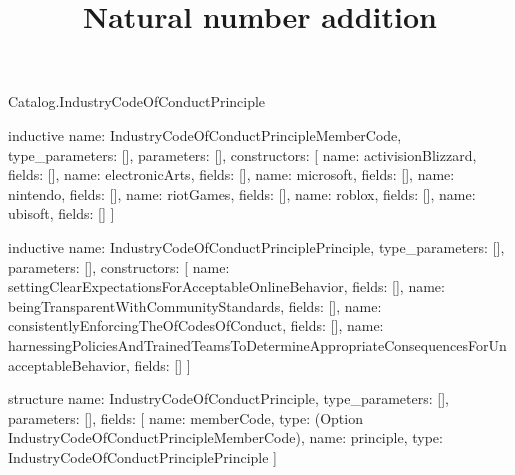 \begin{lexlean}{Catalog.IndustryCodeOfConductPrinciple}
\title{Natural number addition}
\begin{semanticmodule}
inductive{
  name: IndustryCodeOfConductPrincipleMemberCode,
  type_parameters: [],
  parameters: [],
  constructors: [
    {name: activisionBlizzard, fields: []},
    {name: electronicArts, fields: []},
    {name: microsoft, fields: []},
    {name: nintendo, fields: []},
    {name: riotGames, fields: []},
    {name: roblox, fields: []},
    {name: ubisoft, fields: []}
  ]
}

inductive{
  name: IndustryCodeOfConductPrinciplePrinciple,
  type_parameters: [],
  parameters: [],
  constructors: [
    {name: settingClearExpectationsForAcceptableOnlineBehavior, fields: []},
    {name: beingTransparentWithCommunityStandards, fields: []},
    {name: consistentlyEnforcingTheOfCodesOfConduct, fields: []},
    {name: harnessingPoliciesAndTrainedTeamsToDetermineAppropriateConsequencesForUnacceptableBehavior, fields: []}
  ]
}

structure{
  name: IndustryCodeOfConductPrinciple,
  type_parameters: [],
  parameters: [],
  fields: [
    {name: memberCode, type: (Option IndustryCodeOfConductPrincipleMemberCode)},
    {name: principle, type: IndustryCodeOfConductPrinciplePrinciple}
  ]
}
\end{semanticmodule}
\end{lexlean}
